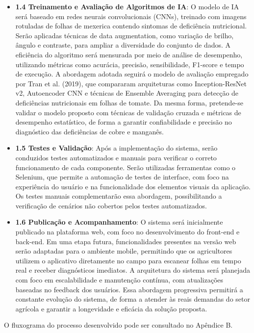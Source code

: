 \begin{itemize}
    \item \textbf{1.4 Treinamento e Avaliação de Algoritmos de IA}: O modelo de IA será baseado em redes neurais convolucionais (CNNs), treinado com imagens rotuladas de folhas de mexerica contendo sintomas de deficiência nutricional. Serão aplicadas técnicas de data augmentation, como variação de brilho, ângulo e contraste, para ampliar a diversidade do conjunto de dados. A eficiência do algoritmo será mensurada por meio de análise de desempenho, utilizando métricas como acurácia, precisão, sensibilidade, F1-score e tempo de execução. A abordagem adotada seguirá o modelo de avaliação empregado por Tran et al. (2019), que compararam arquiteturas como Inception-ResNet v2, Autoencoder CNN e técnicas de Ensemble Averaging para detecção de deficiências nutricionais em folhas de tomate. Da mesma forma, pretende-se validar o modelo proposto com técnicas de validação cruzada e métricas de desempenho estatístico, de forma a garantir confiabilidade e precisão no diagnóstico das deficiências de cobre e manganês.
    \item \textbf{1.5 Testes e Validação}: Após a implementação do sistema, serão conduzidos testes automatizados e manuais para verificar o correto funcionamento de cada componente. Serão utilizadas ferramentas como o Selenium, que permite a automação de testes de interface, com foco na experiência do usuário e na funcionalidade dos elementos visuais da aplicação. Os testes manuais complementarão essa abordagem, possibilitando a verificação de cenários não cobertos pelos testes automatizados.
    \item \textbf{1.6 Publicação e Acompanhamento}: O sistema será inicialmente publicado na plataforma web, com foco no desenvolvimento do front-end e back-end. Em uma etapa futura, funcionalidades presentes na versão web serão adaptadas para o ambiente mobile, permitindo que os agricultores utilizem o aplicativo diretamente no campo para escanear folhas em tempo real e receber diagnósticos imediatos. A arquitetura do sistema será planejada com foco em escalabilidade e manutenção contínua, com atualizações baseadas no feedback dos usuários. Essa abordagem progressiva permitirá a constante evolução do sistema, de forma a atender às reais demandas do setor agrícola e garantir a longevidade e eficácia da solução proposta.
\end{itemize}

O fluxograma do processo desenvolvido pode ser consultado no Apêndice B.

